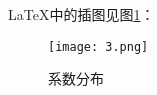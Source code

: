 \documentclass{article} %
\begin{document}
	\LaTeX 中的插图见图\ref{pic3}：
	
	\begin{figure}[htbp] %
		\centering	%
		\texttt{[image: 3.png]}
		\caption{系数分布}	%
		\label{pic3}	%
	\end{figure}
\end{document}
